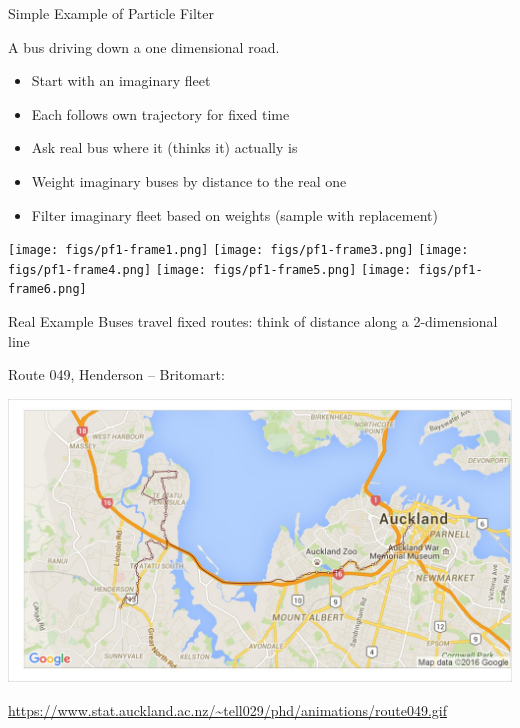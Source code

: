 \documentclass[10pt,t]{beamer}
\begin{document}
  
  


\begin{frame}{Simple Example of Particle Filter}

  A bus driving down a one dimensional road.
  \onslide<+->

  \begin{itemize}[<+- | alert@+>]
  \item Start with an imaginary fleet
  \item Each follows own trajectory for fixed time
  \item Ask real bus where it (thinks it) actually is
  \item Weight imaginary buses by distance to the real one
  \item Filter imaginary fleet based on weights (sample with replacement)
  \end{itemize}
  
  \begin{overprint}
    \centering
    \texttt{[image: figs/pf1-frame1.png]}
    \centering
    \texttt{[image: figs/pf1-frame3.png]}
    \centering
    \texttt{[image: figs/pf1-frame4.png]}
    \centering
    \texttt{[image: figs/pf1-frame5.png]}
    \centering
    \texttt{[image: figs/pf1-frame6.png]}
  \end{overprint}

  \onslide<+->
\end{frame}


\begin{frame}{Real Example}
  Buses travel fixed routes: think of distance along a 2-dimensional line
  
  Route 049, Henderson -- Britomart:
  
  {\centering
  \includegraphics[width=\textwidth]{pf/particle_map001.jpg}}

  \footnotesize\url{https://www.stat.auckland.ac.nz/~tell029/phd/animations/route049.gif}
\end{frame}
\end{document}
